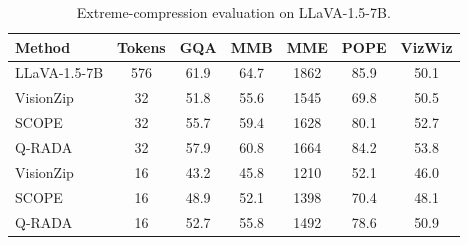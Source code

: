 \begin{table}[t]
\centering
\footnotesize
\setlength{\tabcolsep}{4.8pt}
\caption{Extreme-compression evaluation on LLaVA-1.5-7B.}
\label{tab:extreme-compression}
\begin{tabular}{l|cccccc}
\toprule
Method & Tokens & GQA & MMB & MME & POPE & VizWiz \\
\midrule
LLaVA-1.5-7B & 576 & 61.9 & 64.7 & 1862 & 85.9 & 50.1  \\
\midrule
VisionZip & 32 & 51.8 & 55.6 & 1545 & 69.8 & 50.5 \\
SCOPE & 32 & 55.7 & 59.4 & 1628 & 80.1 & 52.7 \\
\rowcolor{gray!20} Q-RADA & 32 & 57.9 & 60.8 & 1664 & 84.2 & 53.8  \\
\midrule
VisionZip & 16 & 43.2 & 45.8 & 1210 & 52.1 & 46.0  \\
SCOPE & 16 & 48.9 & 52.1 & 1398 & 70.4 & 48.1  \\
\rowcolor{gray!20} Q-RADA & 16 & 52.7 & 55.8 & 1492 & 78.6 & 50.9 \\
\bottomrule
\end{tabular}
\end{table}

